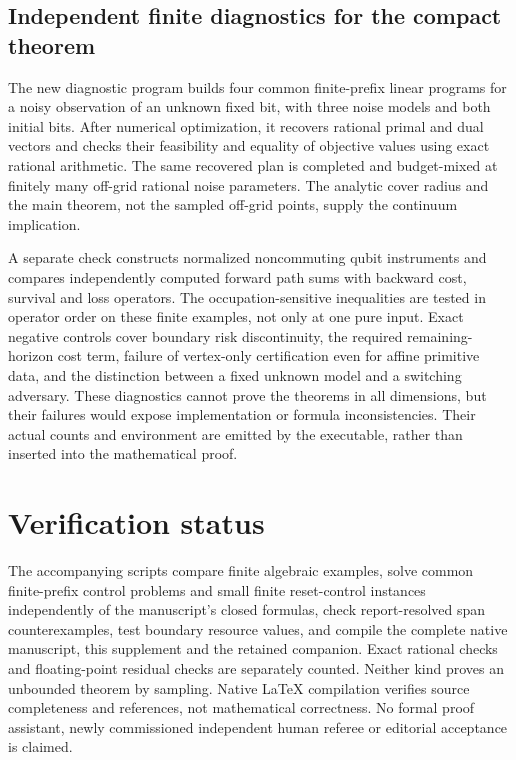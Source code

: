 \subsection{Independent finite diagnostics for the compact theorem}
The new diagnostic program builds four common finite-prefix linear programs for a noisy observation of an unknown fixed bit, with three noise models and both initial bits. After numerical optimization, it recovers rational primal and dual vectors and checks their feasibility and equality of objective values using exact rational arithmetic. The same recovered plan is completed and budget-mixed at finitely many off-grid rational noise parameters. The analytic cover radius and the main theorem, not the sampled off-grid points, supply the continuum implication.

A separate check constructs normalized noncommuting qubit instruments and compares independently computed forward path sums with backward cost, survival and loss operators. The occupation-sensitive inequalities are tested in operator order on these finite examples, not only at one pure input. Exact negative controls cover boundary risk discontinuity, the required remaining-horizon cost term, failure of vertex-only certification even for affine primitive data, and the distinction between a fixed unknown model and a switching adversary. These diagnostics cannot prove the theorems in all dimensions, but their failures would expose implementation or formula inconsistencies. Their actual counts and environment are emitted by the executable, rather than inserted into the mathematical proof.






\section{Verification status}
The accompanying scripts compare finite algebraic examples, solve common finite-prefix control problems and small finite reset-control instances independently of the manuscript's closed formulas, check report-resolved span counterexamples, test boundary resource values, and compile the complete native manuscript, this supplement and the retained companion. Exact rational checks and floating-point residual checks are separately counted. Neither kind proves an unbounded theorem by sampling. Native LaTeX compilation verifies source completeness and references, not mathematical correctness. No formal proof assistant, newly commissioned independent human referee or editorial acceptance is claimed.



